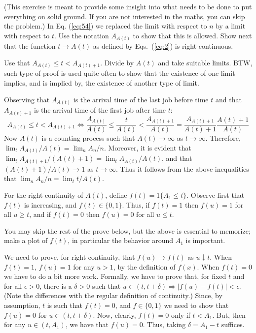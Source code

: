 \begin{exercise}
(This exercise is meant to provide some insight into what needs
  to be done to put everything on solid ground.  If you are not
  interested in the maths, you can skip the problem.)
   In  Eq. (\ref{eq:54}) we replaced the limit with respect to $n$ by a
    limit with respect to $t$.  Use
    the notation $A_{A(t)}$ to show that  this is allowed.
  Show next that the function $t\to A(t)$ as defined by Eqs.~(\ref{eq:2})
  is right-continuous. 
    \begin{hint}
 Use that $A_{A(t)} \leq t < A_{A(t)+1}$. Divide by $A(t)$
      and take suitable limits. BTW, such type of proof is used quite
      often to show that the existence of one limit implies, and is
      implied by, the existence of another type of limit.  
    \end{hint}
 \begin{solution}
 Observing that $A_{A(t)}$ is the arrival time of the last job
    before time $t$ and that $A_{A(t)+1}$ is the arrival time of the
    first job after time $t$: 
  \begin{equation*}
    A_{A(t)}  \leq t  < A_{A(t)+1} \Leftrightarrow 
    \frac{A_{A(t)}} {A(t)}  \leq \frac{t}{A(t)}  <\frac{A_{A(t)+1}}{A(t)} = \frac{A_{A(t)+1}}{A(t)+1}\frac{A(t)+1}{A(t)}
  \end{equation*}
  Now $A(t)$ is a counting process such that $A(t)\to\infty$ as
  $t\to\infty$. Therefore, $\lim_t A_{A(t)}/A(t) = \lim_n
  A_n/n$.
  Moreover, it is evident that
  $\lim_t A_{A(t)+1}/(A(t)+1) = \lim_t A_{A(t)}/A(t)$, and that
  $(A(t)+1)/A(t)\to 1$ as $t\to\infty$. Thus it follows from the above
  inequalities that $\lim_n A_n/n = \lim_t t/A(t)$.
     



  For the right-continuity of $A(t)$, define $f(t) = 1\{A_1 \leq
  t\}$.
  Observe first that $f(t)$ is increasing, and $f(t)\in\{0,1\}$. Thus,
  if $f(t)=1$ then $f(u)=1$ for all $u\geq t$, and if $f(t)=0$ then
  $f(u) = 0$ for all $u\leq t$.

    You may skip the rest of the prove below, but the above is
    essential to memorize; make a plot of $f(t)$, in particular the
    behavior around $A_1$ is important.

    We need to prove, for right-continuity, that $f(u)\to f(t) $ as
    $u\downarrow t$. When $f(t)=1$, $f(u)=1$ for any $u>1$, by the
    definition of $f(x)$. When $f(t)=0$ we have to do a bit more
    work. Formally, we have to prove that, for fixed $t$ and for all
    $\epsilon > 0$, there is a $\delta>0$ such that
    $u\in(t, t+\delta) \Rightarrow |f(u) -f(t)| < \epsilon$. (Note the
    differences with the regular definition of continuity.) Since, by
    assumption, $t$ is such that $f(t)=0$, and $f\in\{0,1\}$ we need
    to show that $f(u)=0$ for $u\in(t, t+\delta)$. Now, clearly, 
    $f(t)=0$ only if $t < A_1$.  But, then for any $u\in(t, A_1)$, we
    have that $f(u) = 0$. Thus, taking $\delta = A_1 - t$ suffices.


\end{solution}
\end{exercise}
